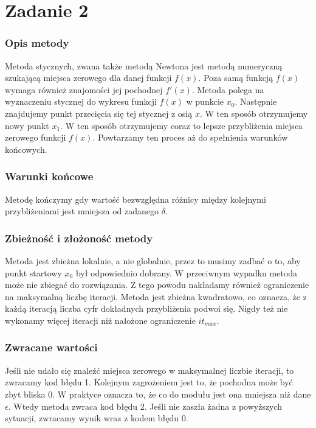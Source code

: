 \documentclass{article}
\begin{document}
\section*{Zadanie 2}
\subsubsection*{Opis metody}
Metoda stycznych, zwana także metodą Newtona jest metodą
numeryczną szukającą miejsca zerowego dla danej funkcji $f(x)$.
Poza samą funkcją
$f(x)$ wymaga również znajomości jej pochodnej $f'(x)$. Metoda
polega na wyznaczeniu stycznej do wykresu funkcji $f(x)$ w punkcie
$x_0$. Następnie znajdujemy punkt przecięcia się tej stycznej z osią
$x$. W ten sposób otrzymujemy nowy punkt $x_1$.
W ten sposób otrzymujemy coraz
to lepsze przybliżenia miejsca zerowego funkcji $f(x)$.
Powtarzamy ten proces aż do spełnienia warunków końcowych.

\subsubsection*{Warunki końcowe}
Metodę kończymy gdy wartość bezwzględna różnicy między kolejnymi
przybliżeniami jest mniejsza od zadanego $\delta$.

\subsubsection*{Zbieżność i złożoność metody}
Metoda jest zbieżna lokalnie, a nie globalnie, przez to musimy
zadbać o to, aby punkt startowy $x_0$ był odpowiednio dobrany.
W przeciwnym wypadku metoda może nie zbiegać do rozwiązania.
Z tego powodu nakładamy również ograniczenie na maksymalną liczbę iteracji.
Metoda jest zbieżna kwadratowo, co oznacza, że z każdą iteracją
liczba cyfr dokładnych przybliżenia podwoi się. Nigdy też nie wykonamy
więcej iteracji niż nałożone ograniczenie $it_{max}$.

\subsubsection*{Zwracane wartości}
Jeśli nie udało się znaleźć miejsca zerowego w maksymalnej liczbie iteracji, to
zwracamy kod błędu 1. Kolejnym zagrożeniem jest to, że pochodna może
być zbyt bliska 0. W praktyce oznacza to, że co do modułu jest ona
mniejsza niż dane $\epsilon$. Wtedy metoda zwraca kod błędu 2.
Jeśli nie zaszła żadna z powyższych sytuacji, zwracamy wynik
wraz z kodem błędu 0.
\end{document}
